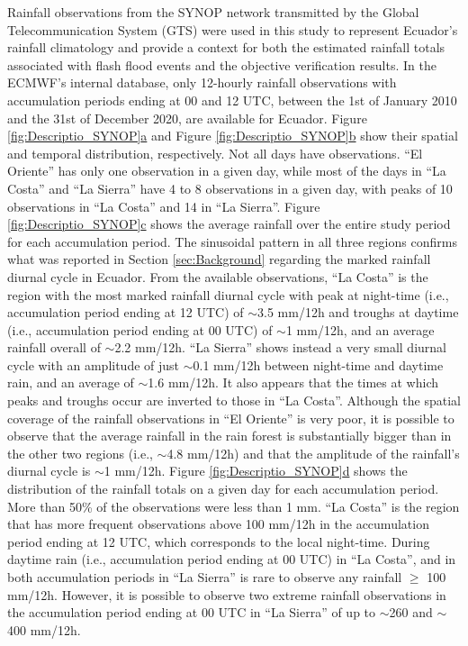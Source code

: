 \documentclass[techmemo]{ecmwfrep}%
\begin{document}
Rainfall observations from the SYNOP network transmitted by the Global Telecommunication System (GTS) were used in this study to represent Ecuador’s rainfall climatology and provide a context for both the estimated rainfall totals associated with flash flood events and the objective verification results. In the ECMWF’s internal database, only 12-hourly rainfall observations with accumulation periods ending at 00 and 12 UTC, between the 1st of January 2010 and the 31st of December 2020, are available for Ecuador. Figure \ref{fig:Descriptio_SYNOP}\hyperref[fig:Descriptio_SYNOP]{a} and Figure \ref{fig:Descriptio_SYNOP}\hyperref[fig:Descriptio_SYNOP]{b} show their spatial and temporal distribution, respectively. Not all days have observations. “El Oriente” has only one observation in a given day, while most of the days in “La Costa” and “La Sierra” have 4 to 8 observations in a given day, with peaks of 10 observations in “La Costa” and 14 in “La Sierra”. Figure \ref{fig:Descriptio_SYNOP}\hyperref[fig:Descriptio_SYNOP]{c} shows the average rainfall over the entire study period for each accumulation period. The sinusoidal pattern in all three regions confirms what was reported in Section \ref{sec:Background} regarding the marked rainfall diurnal cycle in Ecuador. From the available observations, “La Costa” is the region with the most marked rainfall diurnal cycle with peak at night-time (i.e., accumulation period ending at 12 UTC) of $\sim$3.5 mm/12h and troughs at daytime (i.e., accumulation period ending at 00 UTC) of $\sim$1 mm/12h, and an average rainfall overall of $\sim$2.2 mm/12h. “La Sierra” shows instead a very small diurnal cycle with an amplitude of just $\sim$0.1 mm/12h between night-time and daytime rain, and an average of $\sim$1.6 mm/12h. It also appears that the times at which peaks and troughs occur are inverted to those in “La Costa”.  Although the spatial coverage of the rainfall observations in “El Oriente” is very poor, it is possible to observe that the average rainfall in the rain forest is substantially bigger than in the other two regions (i.e., $\sim${}4.8 mm/12h) and that the amplitude of the rainfall’s diurnal cycle is $\sim$1 mm/12h. Figure \ref{fig:Descriptio_SYNOP}\hyperref[fig:Descriptio_SYNOP]{d} shows the distribution of the rainfall totals on a given day for each accumulation period. More than 50\% of the observations were less than 1 mm. “La Costa” is the region that has more frequent observations above 100 mm/12h in the accumulation period ending at 12 UTC, which corresponds to the local night-time. During daytime rain (i.e., accumulation period ending at 00 UTC) in “La Costa”, and in both accumulation periods in “La Sierra” is rare to observe any rainfall $\geq$ 100 mm/12h. However, it is possible to observe two extreme rainfall observations in the  accumulation period ending at 00 UTC in “La Sierra” of up to $\sim$260 and $\sim$400 mm/12h. 
\end{document}

